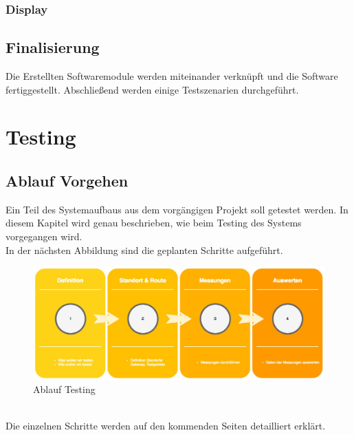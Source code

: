 \documentclass[11pt,english,german]{report}
\theoremstyle{definition}
\begin{document}
\subsection{Display}

\newpage
\section{Finalisierung}
Die Erstellten Softwaremodule werden miteinander verknüpft und die Software fertiggestellt. Abschließend werden einige Testszenarien durchgeführt. 

\chapter{Testing}
\section{Ablauf Vorgehen}
Ein Teil des Systemaufbaus aus dem vorgängigen Projekt soll getestet werden. In diesem Kapitel wird genau beschrieben, wie beim Testing des Systems vorgegangen wird.\\[0.3cm]
In der nächsten Abbildung sind die geplanten Schritte aufgeführt.
\begin{figure}[h]
	\centering
	\includegraphics[width=\textwidth]{img/projectFlow_testing.jpg}
	\caption[Flowchart Testing]
	{Ablauf Testing}
\end{figure}
\\ 
Die einzelnen Schritte werden auf den kommenden Seiten detailliert erklärt.
\newpage
\end{document}
